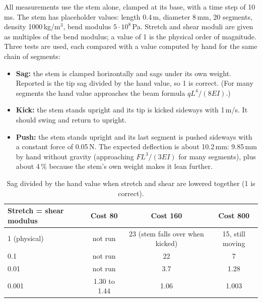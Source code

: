All measurements use the stem alone, clamped at its base, with a time step of 10\,ms. The stem has
placeholder values: length 0.4\,m, diameter 8\,mm, 20 segments, density 1000\,kg/m$^3$, bend modulus
$5\cdot10^{8}$\,Pa. Stretch and shear moduli are given as multiples of the bend modulus; a value of 1 is
the physical order of magnitude. Three tests are used, each compared with a value computed by hand for the
same chain of segments:
\begin{itemize}
  \item \textbf{Sag:} the stem is clamped horizontally and sags under its own weight. Reported is the tip
        sag divided by the hand value, so 1 is correct. (For many segments the hand value approaches the
        beam formula $qL^{4}/(8EI)$.)
  \item \textbf{Kick:} the stem stands upright and its tip is kicked sideways with 1\,m/s. It should swing
        and return to upright.
  \item \textbf{Push:} the stem stands upright and its last segment is pushed sideways with a constant
        force of 0.05\,N. The expected deflection is about 10.2\,mm: 9.85\,mm by hand without gravity
        (approaching $FL^{3}/(3EI)$ for many segments), plus about 4\,\% because the stem's own weight
        makes it lean further.
\end{itemize}

\begin{table}[h]
  \centering
  \caption{Sag divided by the hand value when stretch and shear are lowered together (1 is correct).}
  \label{tab:stem-together}
  \begin{tabular}{lccc}
    \toprule
    Stretch = shear modulus & Cost 80 & Cost 160 & Cost 800 \\
    \midrule
    1 (physical)  & not run      & 23 (stem falls over when kicked) & 15, still moving \\
    0.1           & not run      & 22   & 7     \\
    0.01          & not run      & 3.7  & 1.28  \\
    0.001         & 1.30 to 1.44 & 1.06 & 1.003 \\
    \bottomrule
  \end{tabular}
\end{table}

